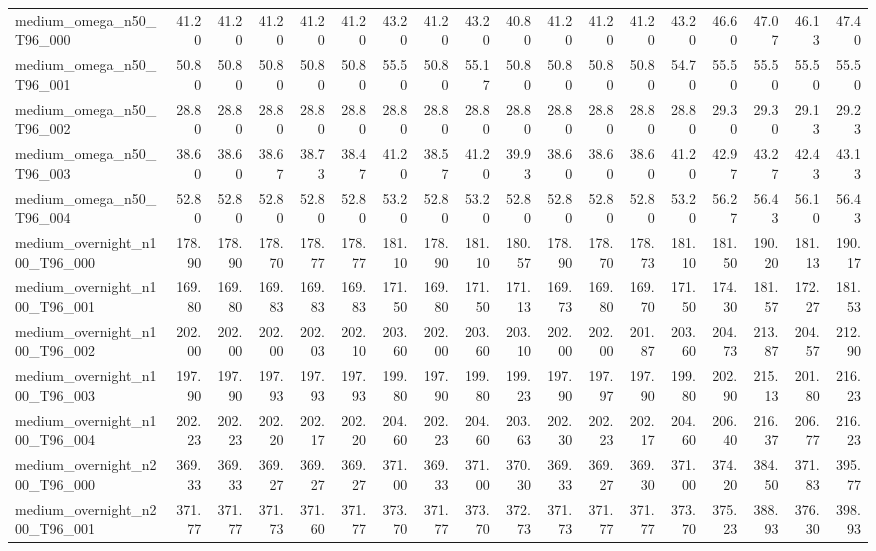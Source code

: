 \begin{table}[htbp]
\begin{tabular}{lrrrrrrrrrrrrrrrrr}
medium\_omega\_n50\_T96\_000 & 41.20 & 41.20 & 41.20 & 41.20 & 41.20 & 43.20 & 41.20 & 43.20 & 40.80 & 41.20 & 41.20 & 41.20 & 43.20 & 46.60 & 47.07 & 46.13 & 47.40 \\
medium\_omega\_n50\_T96\_001 & 50.80 & 50.80 & 50.80 & 50.80 & 50.80 & 55.50 & 50.80 & 55.17 & 50.80 & 50.80 & 50.80 & 50.80 & 54.70 & 55.50 & 55.50 & 55.50 & 55.50 \\
medium\_omega\_n50\_T96\_002 & 28.80 & 28.80 & 28.80 & 28.80 & 28.80 & 28.80 & 28.80 & 28.80 & 28.80 & 28.80 & 28.80 & 28.80 & 28.80 & 29.30 & 29.30 & 29.13 & 29.23 \\
medium\_omega\_n50\_T96\_003 & 38.60 & 38.60 & 38.67 & 38.73 & 38.47 & 41.20 & 38.57 & 41.20 & 39.93 & 38.60 & 38.60 & 38.60 & 41.20 & 42.97 & 43.27 & 42.43 & 43.13 \\
medium\_omega\_n50\_T96\_004 & 52.80 & 52.80 & 52.80 & 52.80 & 52.80 & 53.20 & 52.80 & 53.20 & 52.80 & 52.80 & 52.80 & 52.80 & 53.20 & 56.27 & 56.43 & 56.10 & 56.43 \\
medium\_overnight\_n100\_T96\_000 & 178.90 & 178.90 & 178.70 & 178.77 & 178.77 & 181.10 & 178.90 & 181.10 & 180.57 & 178.90 & 178.70 & 178.73 & 181.10 & 181.50 & 190.20 & 181.13 & 190.17 \\
medium\_overnight\_n100\_T96\_001 & 169.80 & 169.80 & 169.83 & 169.83 & 169.83 & 171.50 & 169.80 & 171.50 & 171.13 & 169.73 & 169.80 & 169.70 & 171.50 & 174.30 & 181.57 & 172.27 & 181.53 \\
medium\_overnight\_n100\_T96\_002 & 202.00 & 202.00 & 202.00 & 202.03 & 202.10 & 203.60 & 202.00 & 203.60 & 203.10 & 202.00 & 202.00 & 201.87 & 203.60 & 204.73 & 213.87 & 204.57 & 212.90 \\
medium\_overnight\_n100\_T96\_003 & 197.90 & 197.90 & 197.93 & 197.93 & 197.93 & 199.80 & 197.90 & 199.80 & 199.23 & 197.90 & 197.97 & 197.90 & 199.80 & 202.90 & 215.13 & 201.80 & 216.23 \\
medium\_overnight\_n100\_T96\_004 & 202.23 & 202.23 & 202.20 & 202.17 & 202.20 & 204.60 & 202.23 & 204.60 & 203.63 & 202.30 & 202.23 & 202.17 & 204.60 & 206.40 & 216.37 & 206.77 & 216.23 \\
medium\_overnight\_n200\_T96\_000 & 369.33 & 369.33 & 369.27 & 369.27 & 369.27 & 371.00 & 369.33 & 371.00 & 370.30 & 369.33 & 369.27 & 369.30 & 371.00 & 374.20 & 384.50 & 371.83 & 395.77 \\
medium\_overnight\_n200\_T96\_001 & 371.77 & 371.77 & 371.73 & 371.60 & 371.77 & 373.70 & 371.77 & 373.70 & 372.73 & 371.73 & 371.77 & 371.77 & 373.70 & 375.23 & 388.93 & 376.30 & 398.93 \\

\end{tabular}
\end{table}
